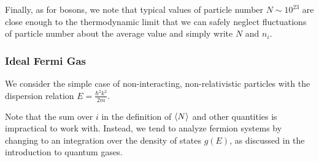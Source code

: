 \documentclass[11pt, a4paper]{article}
\begin{document}
\begin{itemize}
	Finally, as for bosons, we note that typical values of particle number $ N \sim 10^{23} $ are close enough to the thermodynamic limit that we can safely neglect fluctuations of particle number about the average value and simply write $ N $ and $ n_{i} $.
\end{itemize}

\subsubsection{Ideal Fermi Gas}
We consider the simple case of non-interacting, non-relativistic particles with the dispersion relation $ E = \frac{\hbar^{2}k^{2}}{2m} $.

Note that the sum over $ i $ in the definition of $ \expval{N} $ and other quantities is impractical to work with. Instead, we tend to analyze fermion systems by changing to an integration over the density of states $ g(E) $, as discussed in the introduction to quantum gases. 
\end{document}
